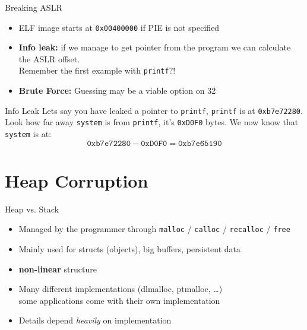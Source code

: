 \documentclass[beamer]{uibk}
\begin{document}
\begin{frame}{Breaking ASLR}
    \begin{itemize}
        \item ELF image starts at \texttt{0x00400000} if PIE is not specified
        \medskip
        \pause
        \item \textbf{Info leak:} if we manage to get pointer from the program
            we can calculate the ASLR offset.\\
            Remember the first example with \texttt{printf}?!
        \medskip
    \item \textbf{Brute Force:} Guessing may be a viable option on
        \SI{32}{\bit}
    \end{itemize}
\end{frame}

\begin{frame}{Info Leak}
    Lets say you have leaked a pointer to \texttt{printf}, \texttt{printf} is
    at  \texttt{0xb7e72280}.
    \bigskip
    Look how far away \texttt{system} is from \texttt{printf}, it's
    \texttt{0xD0F0} bytes.
    \bigskip
    We now know that \texttt{system} is at:
    \[ \mathtt{0xb7e72280} - \mathtt{0xD0F0} = \mathtt{0xb7e65190} \]
\end{frame}

\section{Heap Corruption}

\begin{frame}{Heap vs. Stack}
    \begin{itemize}
        \item Managed by the programmer through \texttt{malloc} /
            \texttt{calloc} / \texttt{recalloc} / \texttt{free}
        \medskip
        \item Mainly used for structs (objects), big buffers, persistent data
        \medskip
        \item \textbf{non-linear} structure
        \medskip
        \item Many different implementations (dlmalloc, ptmalloc, \dots)\\
            some applications come with their own implementation
        \medskip
        \item Details depend \emph{heavily} on implementation
    \end{itemize}
\end{frame}
\end{document}
